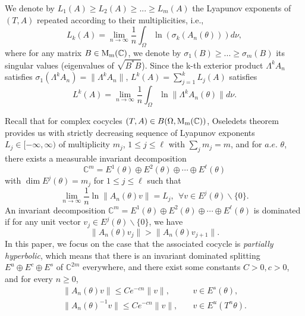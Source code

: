 \documentclass[reqno,11pt]{amsart}
\newcommand{\C}{{\mathbb C}}
\begin{document}
We denote by $L_1(A)\geq L_2(A)\geq...\geq L_m(A)$ the Lyapunov exponents of $(T,A)$ repeated according to their multiplicities, i.e.,
$$
L_k(A)=\lim\limits_{n\rightarrow\infty}\frac{1}{n}\int_{\Omega}\ln(\sigma_k(A_n(\theta)))d\nu,
$$
where for any matrix $B\in {\rm M_m}(\C)$, we denote by
$\sigma_1(B)\geq...\geq \sigma_m(B)$ its singular values (eigenvalues
of $\sqrt{B^*B}$).  Since the k-th exterior product $\Lambda^k A_n$ satisfies $\sigma_1(\Lambda^k A_n)=\|\Lambda^k A_n\|$, $L^k(A)=\sum_{j=1}^kL_j(A)$ satisfies
$$
L^k(A)=\lim\limits_{n\rightarrow \infty}\frac{1}{n}\int_{\Omega}\ln\|\Lambda^kA_n(\theta)\|d\nu.
$$




 Recall that
for complex cocycles $(T,A)\in B(\Omega,{\rm M_m}(\C))$, Oseledets theorem provides us with  strictly decreasing
sequence of Lyapunov exponents $L_j \in [-\infty,\infty)$ of multiplicity $m_j$, $1\leq j \leq \ell$ with $\sum_{j}m_j=m$, and for $a.e.$ $\theta$, there exists
a measurable invariant decomposition $$\C^m=E^{1}(\theta)\oplus E^2(\theta)\oplus\cdots\oplus E^{\ell}(\theta)$$ with $\dim E^j(\theta)=m_j$ for $1\leq j\leq \ell$ such that $$
\lim\limits_{n\rightarrow\infty}\frac{1}{n}\ln\|A_n(\theta)v\|=L_j,\ \  \forall v\in E^j(\theta)\backslash\{0\}.
$$
An invariant decomposition $\C^m=E^{1}(\theta)\oplus E^2(\theta)\oplus\cdots\oplus E^{\ell}{(\theta)}$  is   dominated if for any unit vector $v_j\in E^j(\theta)\backslash \{0\}$, we have $$\|A_n(\theta)v_j\|>\|A_n(\theta)v_{j+1}\|.$$
In this paper, we focus on the case that the associated cocycle is {\it partially hyperbolic}, which means that there is an invariant dominated splitting $E^u\oplus E^c\oplus E^s$ of $\C^{2m}$ everywhere, and  there exist  some constants $C>0,c>0$, and for every $n\geqslant 0$,
$$
\begin{aligned}
	\| A_n(\theta)v\| \leqslant Ce^{-cn}\| v\|, \quad & v\in E^s(\theta),\\
	\| A_n(\theta)^{-1}v\| \leqslant Ce^{-cn}\|v\|,  \quad & v\in E^u(T^n\theta).
\end{aligned}
$$ 
\end{document}
